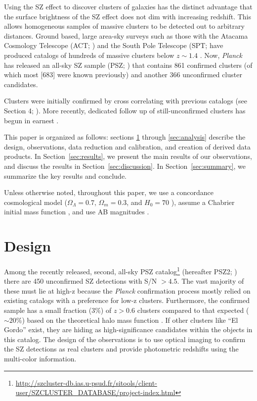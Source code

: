 \documentclass[apj, revtex4]{emulateapj}
\begin{document}
Using the SZ effect to discover clusters of galaxies has the distinct advantage that the surface brightness of the SZ effect does not dim with increasing redshift. This allows homogeneous samples of massive clusters to be detected out to arbitrary distances. Ground based, large area-sky surveys such as those with the Atacama Cosmology Telescope (ACT; \citealt{Swetz2011}) and the South Pole Telescope (SPT; \citealt{Carlstrom2011} have produced catalogs of hundreds of massive clusters below $z \sim 1.4$ . Now, \textit{Planck} \citep{Tauber2010, PlanckCollaboration2011} has released an all-sky SZ sample (PSZ; \citealt{PlanckCollaboration2014, PlanckCollaboration2015}) that contains 861 confirmed clusters (of which most [683] were known previously) and another 366 unconfirmed cluster candidates.

Clusters were initially confirmed by cross correlating with previous catalogs (see Section 4; \citealt{PlanckCollaboration2014}). More recently, dedicated follow up of still-unconfirmed clusters has begun in earnest .

This paper is organized as follows: sections \ref{sec:design} through \ref{sec:analysis} describe the design, observations, data reduction and calibration, and creation of derived data products. In Section~\ref{sec:results}, we present the main results of our observations, and discuss the results in Section~\ref{sec:discussion}. In Section~\ref{sec:summary}, we summarize the key results and conclude.

Unless otherwise noted, throughout this paper, we use a concordance cosmological model ($\Omega_\Lambda = 0.7$, $\Omega_m = 0.3$, and $H_0= 70$ \kms \mpc), assume a Chabrier initial mass function \citep{Chabrier2003}, and use AB magnitudes \citep{Oke1974}.

\section{Design}\label{sec:design}
Among the recently released, second, all-sky PSZ catalog\footnote{\hbox{\url{http://szcluster-db.ias.u-psud.fr/sitools/client-user/SZCLUSTER_DATABASE/project-index.html}}} (hereafter PSZ2; \citealt{PlanckCollaboration2015}) there are 450 unconfirmed SZ detections with S/N $> 4.5$. The vast majority of these must lie at high-z because the \textit{Planck} confirmation process \citep{PlanckCollaboration2014} mostly relied on existing catalogs with a preference for low-z clusters. Furthermore, the confirmed sample has a small fraction (3\%) of $z > 0.6$ clusters compared to that expected ($\sim20$\%) based on the theoretical halo mass function . If other clusters like ``El Gordo'' exist, they are hiding as high-significance candidates within the objects in this catalog. The design of the observations is to use optical imaging to confirm the SZ detections as real clusters and provide photometric redshifts using the multi-color information.
\end{document}
